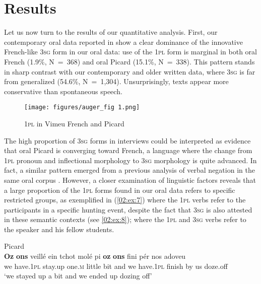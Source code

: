 \documentclass[output=paper,colorlinks,citecolor=brown]{langscibook}
\begin{document}
\section{Results}
Let us now turn to the results of our quantitative analysis. First, our contemporary oral data reported in  show a clear dominance of the innovative French-like 3\textsc{sg} form in our oral data: use of the 1\textsc{pl} form is marginal in both oral French (1.9\%, N~=~368) and oral Picard (15.1\%, N~=~338). This pattern stands in sharp contrast with our contemporary and older written data, where 3\textsc{sg} is far from generalized (54.6\%, N~=~1,304). Unsurprisingly, texts appear more conservative than spontaneous speech.

\begin{figure}
    \texttt{[image: figures/auger\_fig 1.png]}
    \caption{1\textsc{pl} in Vimeu French and Picard}
    \label{02:Fig1}
\end{figure}

\newpage
The high proportion of 3\textsc{sg} forms in interviews could be interpreted as evidence that oral Picard is converging toward French, a language where the change from 1\textsc{pl} pronoun and inflectional morphology to 3\textsc{sg} morphology is quite advanced. In fact, a similar pattern emerged from a previous analysis of verbal negation in the same oral corpus \citep{villeneuve_chtileu_2013}. However, a closer examination of linguistic factors reveals that a large proportion of the 1\textsc{pl} forms found in our oral data refers to specific restricted groups, as exemplified in (\ref{02:ex:7}) where the 1\textsc{pl} verbs refer to the participants in a specific hunting event, despite the fact that 3\textsc{sg} is also attested in these semantic contexts (see \ref{02:ex:8}); where the 1\textsc{pl} and 3\textsc{sg} verbs refer to the speaker and his fellow students.

\ea \label{02:ex:7} Picard\\
\gll \textbf{Oz}  \textbf{ons}         veillé    ein     tchot molé pi   \textbf{oz}  \textbf{ons} 	      fini     pér  nos  adoveu       \\
we  have.1\textsc{pl} stay.up one.\textsc{m} little  bit    and we have.1\textsc{pl} finish by  us   doze.off\\ 
\glt ‘we stayed up a bit and we ended up dozing off’
\z
\end{document}
